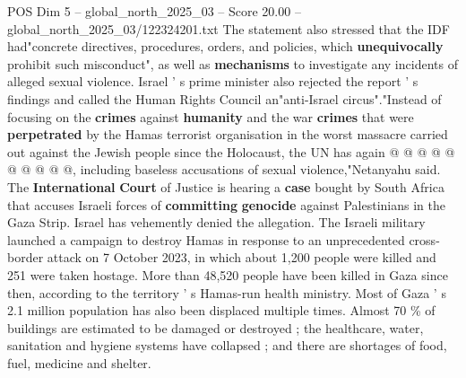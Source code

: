 \begin{textsample}{POS Dim 5 – global\_north\_2025\_03 – Score 20.00 – global\_north\_2025\_03/122324201.txt}
The statement also stressed that the IDF had"concrete directives, procedures, orders, and policies, which \textbf{unequivocally} prohibit such misconduct", as well as \textbf{mechanisms} to investigate any incidents of alleged sexual violence.
Israel ' s prime minister also rejected the report ' s findings and called the Human Rights Council an"anti-Israel circus"."Instead of focusing on the \textbf{crimes} against \textbf{humanity} and the war \textbf{crimes} that were \textbf{perpetrated} by the Hamas terrorist organisation in the worst massacre carried out against the Jewish people since the Holocaust, the UN has again @ @ @ @ @ @ @ @ @ @, including baseless accusations of sexual violence,"Netanyahu said.
The \textbf{International} \textbf{Court} of Justice is hearing a \textbf{case} bought by South Africa that accuses Israeli forces of \textbf{committing} \textbf{genocide} against Palestinians in the Gaza Strip.
Israel has vehemently denied the allegation.
The Israeli military launched a campaign to destroy Hamas in response to an unprecedented cross-border attack on 7 October 2023, in which about 1,200 people were killed and 251 were taken hostage.
More than 48,520 people have been killed in Gaza since then, according to the territory ' s Hamas-run health ministry.
Most of Gaza ' s 2.1 million population has also been displaced multiple times.
Almost 70 \% of buildings are estimated to be damaged or destroyed ; the healthcare, water, sanitation and hygiene systems have collapsed ; and there are shortages of food, fuel, medicine and shelter.

\end{textsample}
